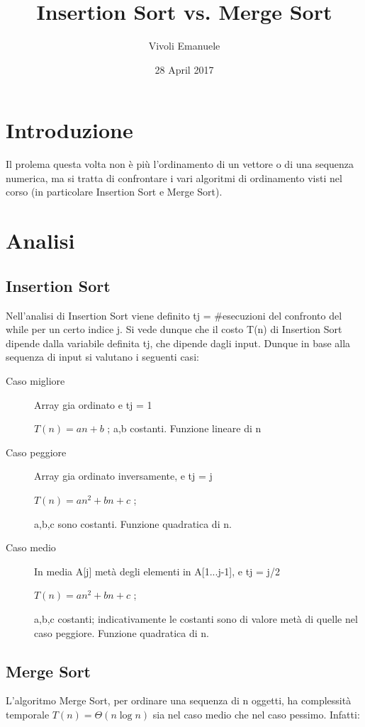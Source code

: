 \documentclass{article}
\title{Insertion Sort vs. Merge Sort}
\author{Vivoli Emanuele }
\date{28 April 2017}
\begin{document}
\maketitle

\section{Introduzione}
Il prolema questa volta non è più l'ordinamento di un vettore o di una sequenza numerica, ma si tratta di confrontare i vari algoritmi di ordinamento visti nel corso (in particolare Insertion Sort e Merge Sort).

\section{Analisi}
\subsection{Insertion Sort}
Nell'analisi di Insertion Sort viene definito tj = #esecuzioni del confronto del while per un certo indice j.
Si vede dunque che il costo T(n) di Insertion Sort dipende dalla variabile definita tj, che dipende dagli input.
Dunque in base alla sequenza di input si valutano i seguenti casi:
\begin{description}

        \item[Caso migliore] Array gia ordinato e tj = 1 
        
        $T(n)= an + b$ ; a,b costanti. Funzione lineare di n
        
        \item[Caso peggiore] Array gia ordinato inversamente, e tj = j
        
        $T(n)= an^2 + bn + c$ ; 
        
        a,b,c sono costanti. Funzione quadratica di n.
        
        \item[Caso medio] In media A[j] metà degli elementi in A[1...j-1], e tj = j/2
        
        $T(n)= an^2 + bn + c$ ; 
        
        a,b,c costanti; indicativamente le costanti sono di valore metà di quelle nel caso peggiore. Funzione quadratica di n.
\end{description}
    
\subsection{Merge Sort}
L'algoritmo Merge Sort, per ordinare una sequenza di n oggetti, ha complessità temporale $T(n)=\Theta (n\log n)$ sia nel caso medio che nel caso pessimo. Infatti:
\end{document}
